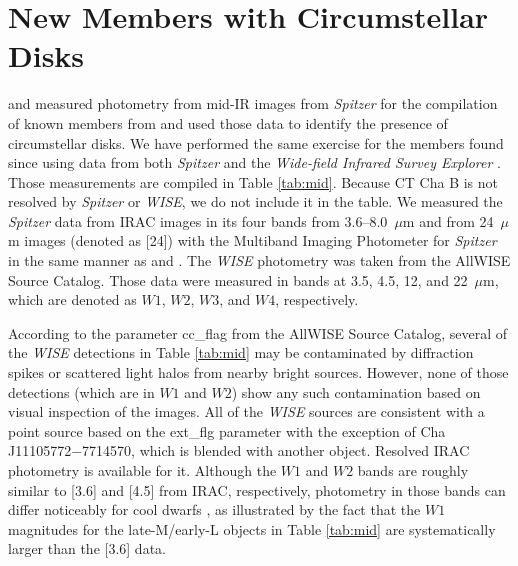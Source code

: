 \documentclass{emulateapj}
\begin{document}
\section{New Members with Circumstellar Disks}
\label{sec:disk}

\cite{luhM08} and \cite{luh08} measured photometry from mid-IR images from
{\it Spitzer} for the compilation of known members from \cite{luhm08} and used
those data to identify the presence of circumstellar disks. 
We have performed the same exercise for the members found since \cite{luhm08} 
using data from both {\it Spitzer} and the {\it Wide-field Infrared Survey
Explorer} \citep[{\it WISE};][]{wri10}.
Those measurements are compiled in Table \ref{tab:mid}. Because CT Cha B 
is not resolved by {\it Spitzer} or {\it WISE}, we do not include it 
in the table. We measured the {\it Spitzer} data from IRAC images in its
four bands from 3.6--8.0~$\mu$m and from 24~$\mu$m images (denoted as [24])
with the Multiband Imaging Photometer for {\it Spitzer} \citep[][]{rie04}
in the same manner as \cite{luh08} and \cite{luhM08}.
The {\it WISE} photometry was taken from the AllWISE Source Catalog.
Those data were measured in bands at 3.5, 4.5, 12, and 22~$\mu$m,
which are denoted as $W1$, $W2$, $W3$, and $W4$, respectively. 

According to the parameter cc\_flag from the AllWISE
Source Catalog, several of the {\it WISE}
detections in Table \ref{tab:mid} may be contaminated by diffraction spikes or
scattered light halos from nearby bright sources. However, none of those
detections (which are in $W1$ and $W2$) show any such contamination based on
visual inspection of the images.
All of the {\it WISE} sources are consistent with a point source based on the
ext\_flg parameter with the exception of Cha J11105772$-$7714570, which is
blended with another object. Resolved IRAC photometry is available for it.
Although the $W1$ and $W2$ bands are roughly similar to [3.6] and [4.5]
from IRAC, respectively, photometry in those bands can differ noticeably for
cool dwarfs \citep{fil15}, as illustrated by the fact that the $W1$ magnitudes
for the late-M/early-L objects in Table \ref{tab:mid} are systematically larger
than the [3.6] data.
\end{document}
